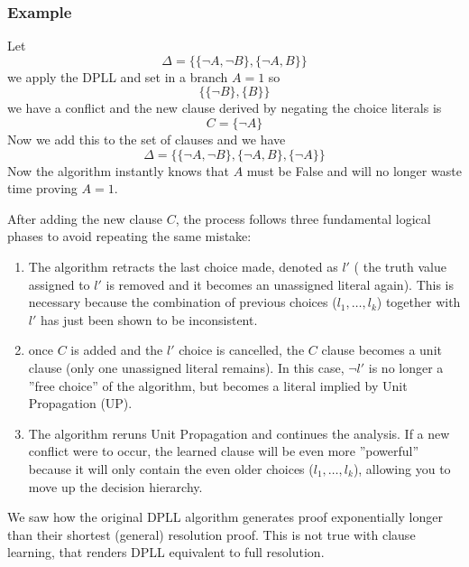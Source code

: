 \documentclass[10pt, letterpaper]{report}
\begin{document}
\subsubsection{Example}
Let $$\Delta=\{\{\lnot A,\lnot B\},\{\lnot A,B\}\}$$
we apply the DPLL and set in a branch $A=1$ so
$$\{\{\lnot B\},\{B\}\}$$
we have a conflict and the new clause derived by negating the choice literals is\begin{equation}
    C=\{\lnot A\}
\end{equation}
Now we add this to the set of clauses and we have 
$$\Delta=\{\{\lnot A,\lnot B\},\{\lnot A,B\}, \{\lnot A\}\}$$
Now the algorithm instantly knows that $A$ must be False and will no longer waste time proving $A = 1$.\bigskip 

After adding the new clause $C$, the process follows three fundamental logical phases to avoid repeating the same mistake:\begin{enumerate}
    \item The algorithm retracts the last choice made, denoted as $l'$ ( the truth value assigned to $l'$ is removed and it becomes an unassigned literal again). This is necessary because the combination of previous choices ($l_1, \dots, l_k$) together with $l'$ has just been shown to be inconsistent.
    \item  once $C$ is added and the $l'$ choice is cancelled, the $C$ clause becomes a unit clause (only one unassigned literal remains). In this case, $\lnot l'$ is no longer a ''free choice'' of the algorithm, but becomes a literal implied by Unit Propagation (UP).
    \item The algorithm reruns Unit Propagation and continues the analysis. If a new conflict were to occur, the learned clause will be even more ''powerful'' because it will only contain the even older choices ($l_1, \dots, l_k$), allowing you to move up the decision hierarchy.
\end{enumerate}
We saw how the original DPLL algorithm generates proof  exponentially
 longer than their shortest (general) resolution proof. This is not true with clause learning, that renders DPLL equivalent to full resolution.
\end{document}

